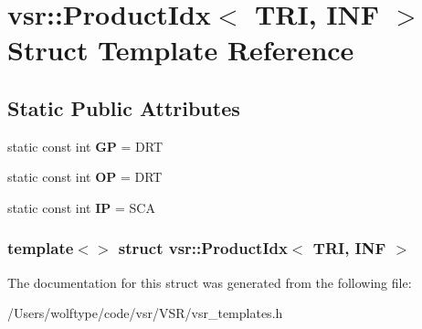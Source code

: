 \hypertarget{structvsr_1_1_product_idx_3_01_t_r_i_00_01_i_n_f_01_4}{\section{vsr\-:\-:Product\-Idx$<$ T\-R\-I, I\-N\-F $>$ Struct Template Reference}
\label{structvsr_1_1_product_idx_3_01_t_r_i_00_01_i_n_f_01_4}
}
\subsection*{Static Public Attributes}
\begin{DoxyCompactItemize}
\item 
\hypertarget{structvsr_1_1_product_idx_3_01_t_r_i_00_01_i_n_f_01_4_a4105fb648102d2e04f11ceb22b921ab2}{static const int {\bfseries G\-P} = D\-R\-T}\label{structvsr_1_1_product_idx_3_01_t_r_i_00_01_i_n_f_01_4_a4105fb648102d2e04f11ceb22b921ab2}

\item 
\hypertarget{structvsr_1_1_product_idx_3_01_t_r_i_00_01_i_n_f_01_4_ade046ab96cb31a3d013fd080893e8478}{static const int {\bfseries O\-P} = D\-R\-T}\label{structvsr_1_1_product_idx_3_01_t_r_i_00_01_i_n_f_01_4_ade046ab96cb31a3d013fd080893e8478}

\item 
\hypertarget{structvsr_1_1_product_idx_3_01_t_r_i_00_01_i_n_f_01_4_a8bc233c48038ee12e881a0058dbb62a2}{static const int {\bfseries I\-P} = S\-C\-A}\label{structvsr_1_1_product_idx_3_01_t_r_i_00_01_i_n_f_01_4_a8bc233c48038ee12e881a0058dbb62a2}

\end{DoxyCompactItemize}
\subsubsection*{template$<$$>$ struct vsr\-::\-Product\-Idx$<$ T\-R\-I, I\-N\-F $>$}



The documentation for this struct was generated from the following file\-:\begin{DoxyCompactItemize}
\item 
/\-Users/wolftype/code/vsr/\-V\-S\-R/vsr\-\_\-templates.\-h\end{DoxyCompactItemize}
